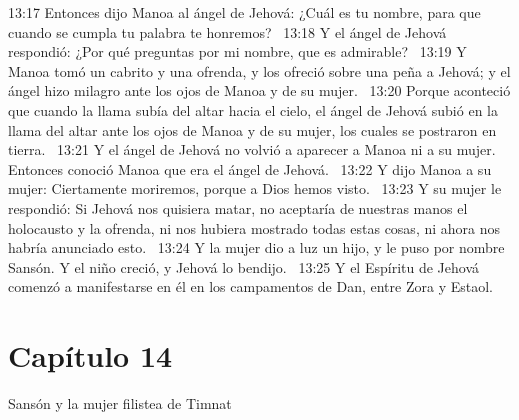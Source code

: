13:17 Entonces dijo Manoa al ángel de Jehová: ¿Cuál es tu nombre, para que cuando se cumpla tu palabra te honremos?  
13:18 Y el ángel de Jehová respondió: ¿Por qué preguntas por mi nombre, que es admirable?  
13:19 Y Manoa tomó un cabrito y una ofrenda, y los ofreció sobre una peña a Jehová; y el ángel hizo milagro ante los ojos de Manoa y de su mujer.  
13:20 Porque aconteció que cuando la llama subía del altar hacia el cielo, el ángel de Jehová subió en la llama del altar ante los ojos de Manoa y de su mujer, los cuales se postraron en tierra.  
13:21 Y el ángel de Jehová no volvió a aparecer a Manoa ni a su mujer. Entonces conoció Manoa que era el ángel de Jehová.  
13:22 Y dijo Manoa a su mujer: Ciertamente moriremos, porque a Dios hemos visto.  
13:23 Y su mujer le respondió: Si Jehová nos quisiera matar, no aceptaría de nuestras manos el holocausto y la ofrenda, ni nos hubiera mostrado todas estas cosas, ni ahora nos habría anunciado esto.  
13:24 Y la mujer dio a luz un hijo, y le puso por nombre Sansón. Y el niño creció, y Jehová lo bendijo.  
13:25 Y el Espíritu de Jehová comenzó a manifestarse en él en los campamentos de Dan, entre Zora y Estaol.  
\section*{Capítulo 14}
Sansón y la mujer filistea de Timnat  

